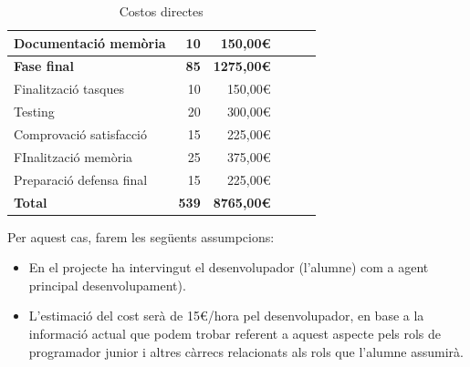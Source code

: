 \begin{table}[htb]
{\begin{tabular}{lrrrrr}
Documentació memòria                         & 10                                                                                       & 150,00\euro                                        \\
\hline
\textbf{Fase final}                          & \textbf{85}                                                                   & \textbf{1275,00\euro}                              \\
\hline
Finalització tasques                         & 10                                                                                     & 150,00\euro                                        \\
Testing                                      & 20                                                                                      & 300,00\euro                                        \\
Comprovació satisfacció                      & 15                                                                                      & 225,00\euro                                        \\
FInalització memòria                         & 25                                                                                     & 375,00\euro                                        \\
Preparació defensa final                     & 15                                                                                     & 225,00\euro                                        \\
\hline
\textbf{Total}                               & \textbf{539}                                                                 & \textbf{8765,00\euro}       \\
\hline                      
\end{tabular}}
\caption{Costos directes}
\end{table}

Per aquest cas, farem les següents assumpcions:

\begin{itemize}
\item En el projecte ha intervingut el desenvolupador (l'alumne) com a agent principal desenvolupament).
\item L'estimació del cost serà de 15\euro /hora pel desenvolupador, en base a la informació actual que podem trobar referent a aquest aspecte pels rols de programador junior i altres càrrecs relacionats als rols que l'alumne assumirà.
\end{itemize}


